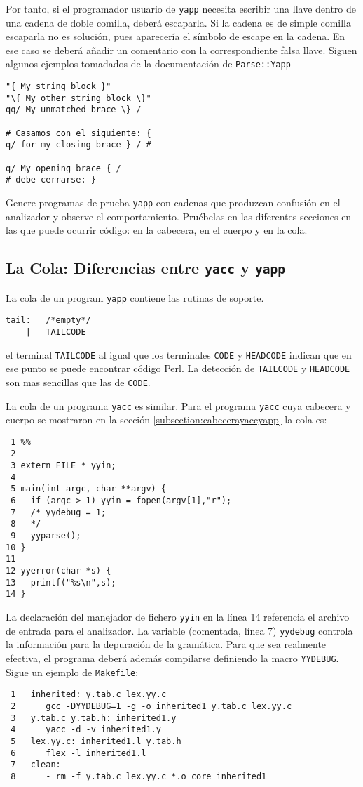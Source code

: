Por tanto, si el programador usuario de \verb|yapp| necesita 
escribir una llave dentro de una cadena de doble comilla, deberá escaparla.
Si la cadena es de simple comilla escaparla no es solución, pues 
aparecería el símbolo de escape en la cadena. En ese caso se deberá añadir 
un comentario con la correspondiente falsa llave. Siguen
algunos ejemplos tomadados de la documentación de \verb|Parse::Yapp|
\begin{verbatim}
"{ My string block }"
"\{ My other string block \}"
qq/ My unmatched brace \} /

# Casamos con el siguiente: {
q/ for my closing brace } / # 

q/ My opening brace { /
# debe cerrarse: }
\end{verbatim}

\begin{exercise}
Genere programas de prueba \verb|yapp| con cadenas que produzcan confusión
en el analizador y observe el comportamiento. Pruébelas en las diferentes
secciones en las que puede ocurrir código: en la cabecera, en el cuerpo 
y en la cola.
\end{exercise}

\subsection{La Cola: Diferencias entre {\tt yacc} y {\tt yapp}}
\label{subsection:colayaccyapp}
La cola de un program \verb|yapp| contiene las rutinas de soporte.
\begin{verbatim}
tail:   /*empty*/
    |   TAILCODE   
\end{verbatim}
el terminal \verb|TAILCODE| al igual que los terminales
\verb|CODE| y \verb|HEADCODE| indican que en ese punto se puede encontrar 
código Perl. La detección de \verb|TAILCODE| y \verb|HEADCODE| son mas sencillas
que las de \verb|CODE|.

La cola de un programa \verb|yacc| es similar.
Para el programa \verb|yacc| cuya cabecera y cuerpo
se mostraron en la sección 
\ref{subsection:cabecerayaccyapp}
la cola es:
\begin{verbatim}
 1 %%
 2 
 3 extern FILE * yyin;
 4 
 5 main(int argc, char **argv) {
 6   if (argc > 1) yyin = fopen(argv[1],"r");
 7   /* yydebug = 1;
 8   */
 9   yyparse();
10 }
11 
12 yyerror(char *s) {
13   printf("%s\n",s);
14 }
\end{verbatim}

La declaración del manejador de fichero \verb|yyin| en la línea 14 
referencia el archivo 
de entrada para el analizador. La variable (comentada, línea 7) 
\verb|yydebug| controla la información para la depuración de la gramática.
Para que sea realmente efectiva, el programa deberá además compilarse
definiendo la macro \verb|YYDEBUG|. Sigue un ejemplo
de \verb|Makefile|:
\begin{verbatim}
 1   inherited: y.tab.c lex.yy.c
 2      gcc -DYYDEBUG=1 -g -o inherited1 y.tab.c lex.yy.c
 3   y.tab.c y.tab.h: inherited1.y 
 4      yacc -d -v inherited1.y 
 5   lex.yy.c: inherited1.l y.tab.h
 6      flex -l inherited1.l
 7   clean:
 8      - rm -f y.tab.c lex.yy.c *.o core inherited1
\end{verbatim}

